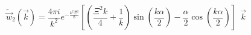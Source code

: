 \documentclass[letterpaper,twocolumn,amsmath,amssymb,prb]{revtex4-1}
\begin{document}
\begin{widetext}



\begin{equation}{\widetilde{\vec{w}}_2(\vec{k})=\frac{4\pi{i}}{k^2}e^{-\frac{k^2\Xi^2}{8}}\left[\left(\frac{\Xi^2k}{4}+\frac{1}{k}\right)\sin\left(\frac{k\alpha}{2}\right)-\frac{\alpha}{2}\cos\left(\frac{k\alpha}{2}\right)\right]{~~}\vec{k}}\end{equation} 
\[{}\]


\end{widetext}
\end{document}
